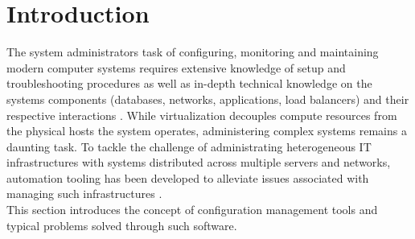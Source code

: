 \section{Introduction}

	The system administrators task of configuring, monitoring and maintaining modern computer systems requires extensive knowledge of setup and troubleshooting procedures as well as in-depth technical knowledge on the systems components (databases, networks, applications, load balancers) and their respective interactions \cite{Barrett:2004:FSC:1031607.1031672}. While virtualization decouples compute resources from the physical hosts the system operates, administering complex systems remains a daunting task. To tackle the challenge of administrating heterogeneous IT infrastructures with systems distributed across multiple servers and networks, automation tooling has been developed to alleviate issues associated with managing such infrastructures \cite{Hintsch2016ARO}. \\ This section introduces the concept of configuration management tools and typical problems solved through such software.


